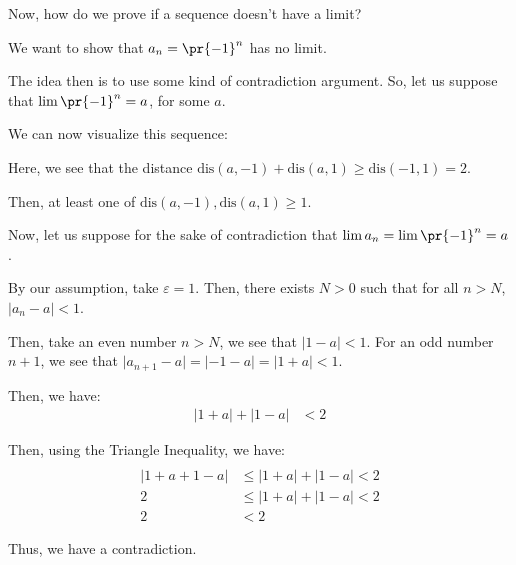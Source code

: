 \documentclass[openany]{book}
\begin{document}
Now, how do we prove if a sequence doesn't have a limit?
\begin{example}
	We want to show that $a_n = \pr{-1}^{n}$ has no limit.
	
	The idea then is to use some kind of contradiction argument. So, let us suppose that $\lim \pr{-1}^{n} = a$, for some $a$.
	
	We can now visualize this sequence:
	
	Here, we see that the distance $\mathrm{dis}(a, -1) + \mathrm{dis}(a, 1) \geq \mathrm{dis}(-1, 1) = 2$.
	
	Then, at least one of $\mathrm{dis}(a, -1), \mathrm{dis}(a, 1) \geq 1$.
	
	Now, let us suppose for the sake of contradiction that $\lim a_n = \lim \pr{-1}^{n} = a$.
	
	By our assumption, take $\varepsilon = 1$. Then, there exists $N > 0$ such that for all $n > N$, $\lvert a_n - a \rvert < 1$.
	
	Then, take an even number $n > N$, we see that $\lvert 1 - a \rvert < 1$. For an odd number $n + 1$, we see that $\lvert a_{n+1} - a \rvert = \lvert -1 - a \rvert = \lvert 1 + a \rvert < 1$.
	
	Then, we have:
	\begin{align*}
		\lvert 1+a \rvert + \lvert 1 - a \rvert &< 2
	\end{align*}
	
	Then, using the Triangle Inequality, we have:
	\begin{align*}
		 \\
		\lvert 1 + a + 1 - a \rvert &\leq \lvert 1 + a \rvert + \lvert 1 - a \rvert < 2 \\
		2 &\leq \lvert 1 + a \rvert + \lvert 1 - a \rvert < 2 \\
		2 &< 2
	\end{align*}
	
	Thus, we have a contradiction.
\end{example}
\end{document}
